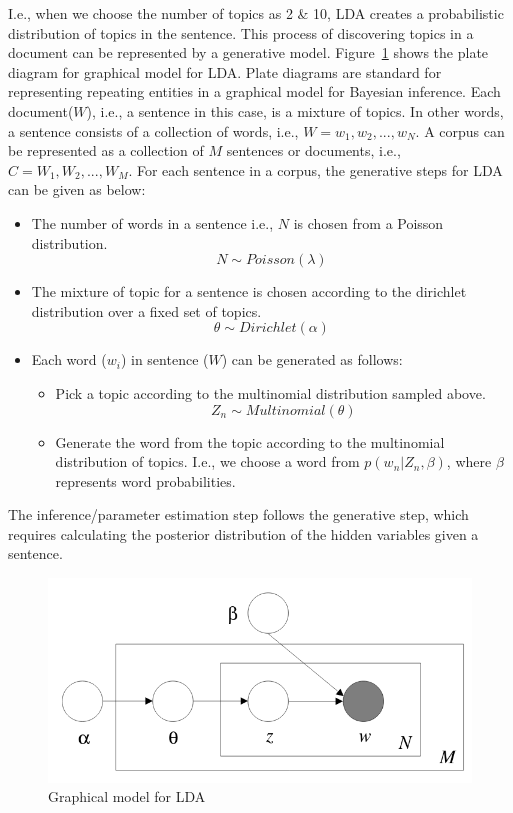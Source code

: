 I.e., when we choose the number of topics as 2 \& 10, LDA creates a probabilistic distribution of topics in the sentence. This process of discovering topics in a document can be represented by a generative model. Figure~\ref{fig:ldaplate} shows the plate diagram for graphical model for LDA. Plate diagrams are standard for representing repeating entities in a graphical model for Bayesian inference. Each document($W$), i.e., a sentence in this case, is a mixture of topics. In other words, a sentence consists of a collection of words, i.e., $W = {w_1,w_2, ..., w_N}$. A corpus can be represented as a collection of $M$ sentences or documents, i.e., $C = {W_1, W_2, ..., W_M}$. For each sentence in a corpus, the generative steps for LDA can be given as below:
\begin{itemize}
    \item The number of words in a sentence i.e., $N$ is chosen from a Poisson distribution.
    $$N \sim Poisson(\lambda)$$
    \item The mixture of topic for a sentence is chosen according to the dirichlet distribution over a fixed set of topics.
    $$\theta \sim Dirichlet(\alpha)$$
    \item Each word ($w_i$) in sentence ($W$) can be generated as follows:
    \begin{itemize}
        \item Pick a topic according to the multinomial distribution sampled above.
        $$Z_n \sim Multinomial(\theta)$$
        \item Generate the word from the topic according to the multinomial distribution of topics. I.e., we choose a word from $p(w_n|Z_n, \beta)$, where $\beta$ represents word probabilities.
    \end{itemize}
    
    
\end{itemize}

The inference/parameter estimation step follows the generative step, which requires calculating the posterior distribution of the hidden variables given a sentence. 




\begin{figure}[t]
    \centering
    \includegraphics[width=\textwidth]{figures/LDA_plate_diagram.png}
 \caption{Graphical model for LDA~\citep{Blei:2003:LDA:944919.944937}}\label{fig:ldaplate}   
 \end{figure}
 

